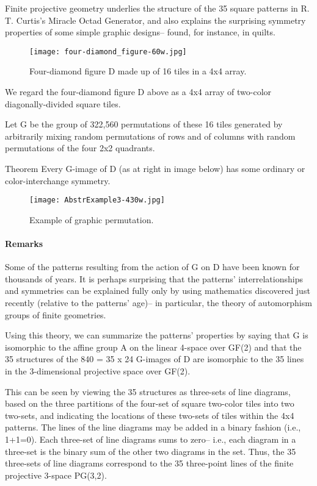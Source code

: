 \documentclass[12pt]{article}
\begin{document}
Finite projective geometry underlies the structure of the 35 square patterns in R. T. Curtis's Miracle Octad Generator, and also explains the surprising symmetry properties of some simple graphic designs-- found, for instance, in quilts.
\begin{figure}
\begin{center}
\texttt{[image: four-diamond\_figure-60w.jpg]}
\end{center}
\caption{Four-diamond figure D made up of 16 tiles in a 4x4 array.}
\end{figure}

We regard the four-diamond figure D above as a 4x4 array of two-color diagonally-divided square tiles.

Let G be the group of 322,560 permutations of these 16 tiles generated by arbitrarily mixing random permutations of rows and of columns with random permutations of the four 2x2 quadrants.

\begin{paragraph}{Theorem} Every G-image of D (as at right in image below) has some ordinary or color-interchange symmetry.
\end{paragraph}

\begin{figure}
\begin{center}
\texttt{[image: AbstrExample3-430w.jpg]}
\end{center}
\caption{Example of graphic permutation.}
\end{figure}

\paragraph{Remarks}

Some of the patterns resulting from the action of G on D have been known for thousands of years. It is perhaps surprising that the patterns' interrelationships and symmetries can be explained fully only by using mathematics discovered just recently (relative to the patterns' age)-- in particular, the theory of automorphism groups of finite geometries.

Using this theory, we can summarize the patterns' properties by saying that G is isomorphic to the affine group A on the linear 4-space over GF(2) and that the 35 structures of the 840 = 35 x 24 G-images of D are isomorphic to the 35 lines in the 3-dimensional projective space over GF(2).

This can be seen by viewing the 35 structures as three-sets of line diagrams, based on the three partitions of the four-set of square two-color tiles into two two-sets, and indicating the locations of these two-sets of tiles within the 4x4 patterns. The lines of the line diagrams may be added in a binary fashion (i.e., 1+1=0). Each three-set of line diagrams sums to zero-- i.e., each diagram in a three-set is the binary sum of the other two diagrams in the set. Thus, the 35 three-sets of line diagrams correspond to the 35 three-point lines of the finite projective 3-space PG(3,2).
\end{document}
